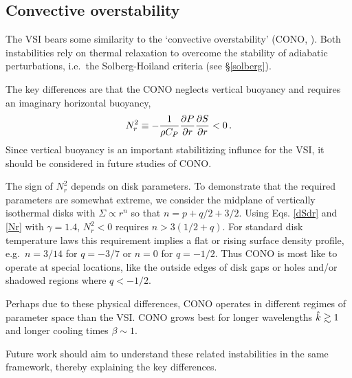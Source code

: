 \subsection{Convective overstability}
The VSI bears some similarity to the `convective overstability'
 (CONO, \citealp{klahr14, lyra14}).   Both instabilities rely on thermal relaxation to 
overcome the stability of adiabatic perturbations, i.e.\ the Solberg-Hoiland
criteria (see \S\ref{solberg}).

The key differences are that the CONO neglects vertical buoyancy
and requires an imaginary horizontal buoyancy,
\begin{align}\label{Nr}
N_r^2 \equiv -{1 \over \rho C_P}{\partial P \over \partial r} {\partial S \over \partial r} < 0\, .
\end{align}
Since vertical buoyancy is an important stabilitizing influnce for the VSI, it should
be considered in future studies of CONO.

The sign of $N_r^2$ depends on disk parameters.  To demonstrate that the required parameters 
are somewhat extreme, we consider the midplane of vertically isothermal disks with 
$\Sigma \propto r^n$ so that $n = p+q/2 + 3/2$. Using Eqs. \ref{dSdr} and \ref{Nr} with $\gamma = 1.4$,
$N_r^2 < 0$ requires $n> 3(1/2 + q)$.  For standard disk temperature laws this requirement implies
a flat or rising surface density profile, e.g.\ $n = 3/14$ for $q = -3/7$ or $n = 0$ for $q = -1/2$.
Thus CONO is most like to operate at special locations, like the outside edges of 
disk gaps or holes and/or shadowed regions where $q < -1/2$.

Perhaps due to these physical differences, CONO operates in different regimes of parameter
space than the VSI.  CONO grows best for longer wavelengths $\hat{k} \gtrsim 1$ and longer 
cooling times $\beta \sim 1$. 

Future work should aim to understand these related instabilities in the same framework, thereby 
explaining the key differences.




